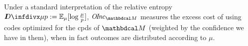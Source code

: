 \documentclass{article}
\begin{document}
Under a standard interpretation of the relative entropy $\kldiv{\mu}{p} := \Ex_{\mu}[\log \frac\mu p]$,
$\OInc_{\dg M}$ measures the excess cost of using codes optimized for the cpds of $\dg M$ (weighted by the confidence we have in them), when in fact outcomes are distributed according to $\mu$.
\end{document}
